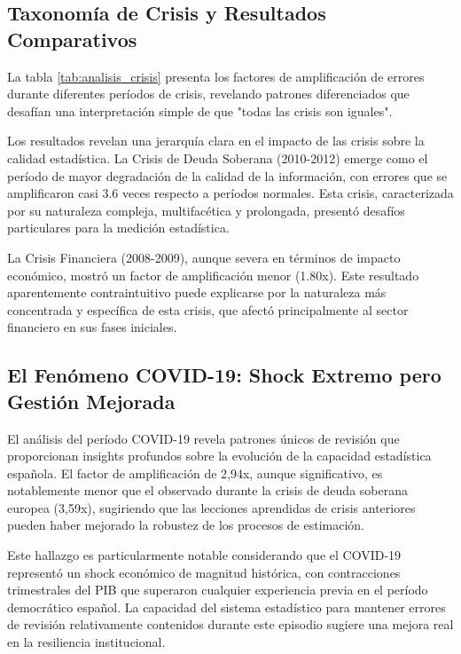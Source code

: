 \documentclass[12pt,a4paper]{article}
\begin{document}
\subsection{Taxonomía de Crisis y Resultados Comparativos}

La tabla \ref{tab:analisis_crisis} presenta los factores de amplificación de errores durante diferentes períodos de crisis, revelando patrones diferenciados que desafían una interpretación simple de que "todas las crisis son iguales".



Los resultados revelan una jerarquía clara en el impacto de las crisis sobre la calidad estadística. La Crisis de Deuda Soberana (2010-2012) emerge como el período de mayor degradación de la calidad de la información, con errores que se amplificaron casi 3.6 veces respecto a períodos normales. Esta crisis, caracterizada por su naturaleza compleja, multifacética y prolongada, presentó desafíos particulares para la medición estadística.

La Crisis Financiera (2008-2009), aunque severa en términos de impacto económico, mostró un factor de amplificación menor (1.80x). Este resultado aparentemente contraintuitivo puede explicarse por la naturaleza más concentrada y específica de esta crisis, que afectó principalmente al sector financiero en sus fases iniciales.

\subsection{El Fenómeno COVID-19: Shock Extremo pero Gestión Mejorada}

El análisis del período COVID-19 revela patrones únicos de revisión que proporcionan insights profundos sobre la evolución de la capacidad estadística española. El factor de amplificación de 2,94x, aunque significativo, es notablemente menor que el observado durante la crisis de deuda soberana europea (3,59x), sugiriendo que las lecciones aprendidas de crisis anteriores pueden haber mejorado la robustez de los procesos de estimación.

Este hallazgo es particularmente notable considerando que el COVID-19 representó un shock económico de magnitud histórica, con contracciones trimestrales del PIB que superaron cualquier experiencia previa en el período democrático español. La capacidad del sistema estadístico para mantener errores de revisión relativamente contenidos durante este episodio sugiere una mejora real en la resiliencia institucional.
\end{document}
